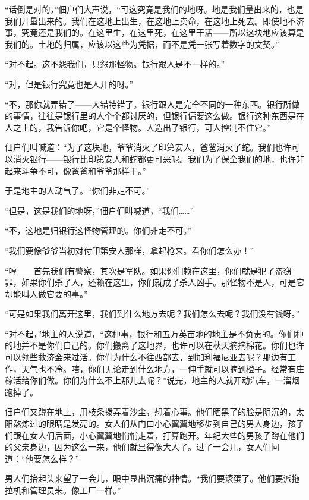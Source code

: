 \documentclass[12pt,UTF-8,openany]{ctexbook}
\begin{document}
\begin{large}
    “话倒是对的，”佃户们大声说，“可这究竟是我们的地呀。地是我们量出来的，也是我们开垦出来的。我们在这地上出生，在这地上卖命，在这地上死去。即使地不济事，究竟还是我们的。在这里生，在这里死，在这里干活——所以这块地应该算是我们的。土地的归属，应该以这些为凭据，而不是凭一张写着数字的文契。”
    
    “对不起。这不怨我们，只怨那怪物。银行跟人是不一样的。”
    
    “对，但是银行究竟也是人开的呀。”
    
    “不，那你就弄错了——大错特错了。银行跟人是完全不同的一种东西。银行所做的事情，往往是银行里的人个个都讨厌的，但银行偏要这么做。银行这种东西是在人之上的，我告诉你吧，它是个怪物。人造出了银行，可人控制不住它。”
    
    佃户们叫喊道：“为了这块地，爷爷消灭了印第安人，爸爸消灭了蛇。我们也许可以消灭银行——银行比印第安人和蛇都更可恶呢。我们为了保全我们的地，也许非起来斗争不可，像爸爸和爷爷那样干。”
    
    于是地主的人动气了。“你们非走不可。”
    
    “但是，这是我们的地呀，”佃户们叫喊道，“我们……”
    
    “不，这地是归银行这怪物管理的。你们非走不可。”
    
    “我们要像爷爷当初对付印第安人那样，拿起枪来。看你们怎么办！”
    
    “哼——首先我们有警察，其次是军队。如果你们赖在这里，你们就是犯了盗窃罪，如果你们杀了人，还赖在这里，你们就成了杀人凶手。那怪物不是人，可是它却能叫人做它要的事。”
    
    “可是如果我们离开这里，我们到什么地方去呢？我们怎么去呢？我们没有钱呀。”
    
    “对不起，”地主的人说道，“这种事，银行和五万英亩地的地主是不负责的。你们种的地并不是你们自己的。你们搬离了这地界，也许可以在秋天摘摘棉花。你们也许可以领些救济金来过活。你们为什么不往西部去，到加利福尼亚去呢？那边有工作，天气也不冷。嗐，你们无论走到什么地方，一伸手就可以摘到橙子。经常有庄稼活给你们做。你们为什么不上那儿去呢？”说完，地主的人就开动汽车，一溜烟跑掉了。
    
    佃户们又蹲在地上，用枝条拨弄着沙尘，想着心事。他们晒黑了的脸是阴沉的，太阳熬炼过的眼睛是发亮的。女人们从门口小心翼翼地移步到自己的男人身边，孩子们跟在女人们后面，小心翼翼地悄悄走着，打算跑开。年纪大些的男孩子蹲在他们的父亲身边，因为这么一来，他们就显得像大人了。过了一会儿，女人们问道：“他要怎么样？”
    
    男人们抬起头来望了一会儿，眼中显出沉痛的神情。“我们要滚蛋了。他们要派拖拉机和管理员来。像工厂一样。”
    

\end{large}
\end{document}
